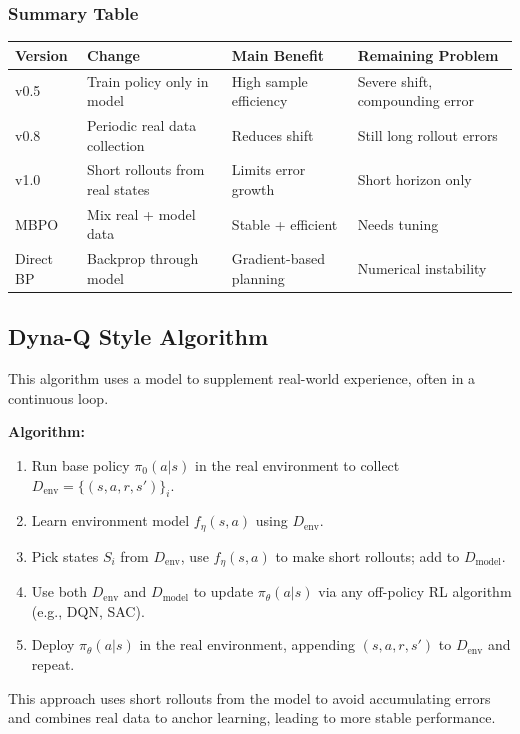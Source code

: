\documentclass[12pt]{article}
\begin{document}
\subsubsection*{Summary Table}
\begin{center}
\begin{tabular}{|l|l|l|l|}
\hline
\textbf{Version} & \textbf{Change} & \textbf{Main Benefit} & \textbf{Remaining Problem} \\
\hline
v0.5 & Train policy only in model & High sample efficiency & Severe shift, compounding error \\
v0.8 & Periodic real data collection & Reduces shift & Still long rollout errors \\
v1.0 & Short rollouts from real states & Limits error growth & Short horizon only \\
MBPO & Mix real + model data & Stable + efficient & Needs tuning \\
Direct BP & Backprop through model & Gradient-based planning & Numerical instability \\
\hline
\end{tabular}
\end{center}


\subsection{Dyna-Q Style Algorithm}
This algorithm uses a model to supplement real-world experience, often in a continuous loop.

\item \textbf{Algorithm:}
\begin{enumerate}
    \item Run base policy $\pi_0(a|s)$ in the real environment to collect $D_{\text{env}} = \{(s,a,r,s')\}_i$.
    \item Learn environment model $f_\eta(s,a)$ using $D_{\text{env}}$.
    \item Pick states $S_i$ from $D_{\text{env}}$, use $f_\eta(s,a)$ to make short rollouts; add to $D_{\text{model}}$.
    \item Use both $D_{\text{env}}$ and $D_{\text{model}}$ to update $\pi_\theta(a|s)$ via any off-policy RL algorithm (e.g., DQN, SAC).
    \item Deploy $\pi_\theta(a|s)$ in the real environment, appending $(s,a,r,s')$ to $D_{\text{env}}$ and repeat.
\end{enumerate}

This approach uses short rollouts from the model to avoid accumulating errors and combines real data to anchor learning, leading to more stable performance.
\end{document}

